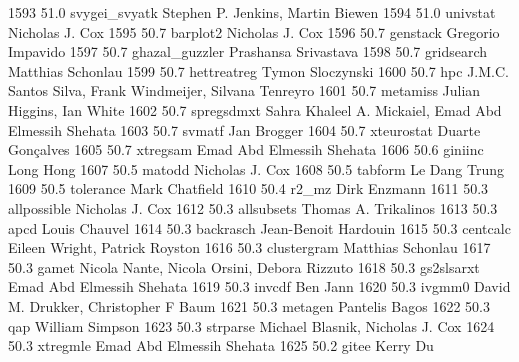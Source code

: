   1593     51.0    svygei_svyatk  Stephen P. Jenkins, Martin Biewen       
  1594     51.0    univstat      Nicholas J. Cox                         
  1595     50.7    barplot2      Nicholas J. Cox                         
  1596     50.7    genstack      Gregorio Impavido                       
  1597     50.7    ghazal_guzzler  Prashansa Srivastava                    
  1598     50.7    gridsearch    Matthias Schonlau                       
  1599     50.7    hettreatreg   Tymon Sloczynski                        
  1600     50.7    hpc           J.M.C. Santos Silva, Frank Windmeijer,  
                                   Silvana Tenreyro                        
  1601     50.7    metamiss      Julian Higgins, Ian White               
  1602     50.7    spregsdmxt    Sahra Khaleel A. Mickaiel, Emad Abd     
                                   Elmessih Shehata                        
  1603     50.7    svmatf        Jan Brogger                             
  1604     50.7    xteurostat    Duarte Gonçalves                       
  1605     50.7    xtregsam      Emad Abd Elmessih Shehata               
  1606     50.6    giniinc       Long Hong                               
  1607     50.5    matodd        Nicholas J. Cox                         
  1608     50.5    tabform       Le Dang Trung                           
  1609     50.5    tolerance     Mark Chatfield                          
  1610     50.4    r2_mz         Dirk Enzmann                            
  1611     50.3    allpossible   Nicholas J. Cox                         
  1612     50.3    allsubsets    Thomas A. Trikalinos                    
  1613     50.3    apcd          Louis Chauvel                           
  1614     50.3    backrasch     Jean-Benoit Hardouin                    
  1615     50.3    centcalc      Eileen Wright, Patrick Royston          
  1616     50.3    clustergram   Matthias Schonlau                       
  1617     50.3    gamet         Nicola Nante, Nicola Orsini, Debora     
                                   Rizzuto                                 
  1618     50.3    gs2slsarxt    Emad Abd Elmessih Shehata               
  1619     50.3    invcdf        Ben Jann                                
  1620     50.3    ivgmm0        David M. Drukker, Christopher F Baum    
  1621     50.3    metagen       Pantelis Bagos                          
  1622     50.3    qap           William Simpson                         
  1623     50.3    strparse      Michael Blasnik, Nicholas J. Cox        
  1624     50.3    xtregmle      Emad Abd Elmessih Shehata               
  1625     50.2    gitee         Kerry Du                                
